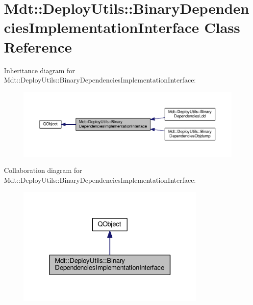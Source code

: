 \hypertarget{class_mdt_1_1_deploy_utils_1_1_binary_dependencies_implementation_interface}{}\section{Mdt\+:\+:Deploy\+Utils\+:\+:Binary\+Dependencies\+Implementation\+Interface Class Reference}
\label{class_mdt_1_1_deploy_utils_1_1_binary_dependencies_implementation_interface}


Inheritance diagram for Mdt\+:\+:Deploy\+Utils\+:\+:Binary\+Dependencies\+Implementation\+Interface\+:
\nopagebreak
\begin{figure}[H]
\begin{center}
\leavevmode
\includegraphics[width=350pt]{class_mdt_1_1_deploy_utils_1_1_binary_dependencies_implementation_interface__inherit__graph}
\end{center}
\end{figure}


Collaboration diagram for Mdt\+:\+:Deploy\+Utils\+:\+:Binary\+Dependencies\+Implementation\+Interface\+:
\nopagebreak
\begin{figure}[H]
\begin{center}
\leavevmode
\includegraphics[width=264pt]{class_mdt_1_1_deploy_utils_1_1_binary_dependencies_implementation_interface__coll__graph}
\end{center}
\end{figure}
